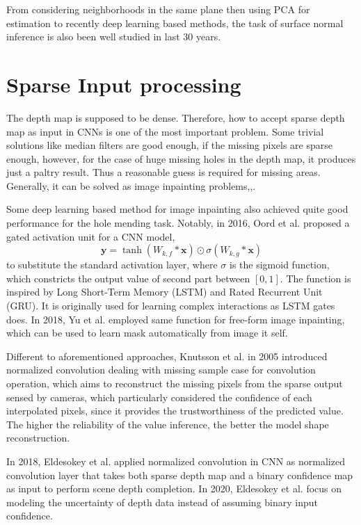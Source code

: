 From considering neighborhoods in the same plane then using PCA for estimation to recently deep learning based methods, the task of surface normal inference is also been well studied in last 30 years. 


\section{Sparse Input processing}

The depth map is supposed to be dense. Therefore, how to accept sparse depth map as input in CNNs is one of the most important problem. Some trivial solutions like median filters are good enough, if the missing pixels are sparse enough, however, for the case of huge missing holes in the depth map, it produces just a paltry result. Thus a reasonable guess is required for missing areas. Generally, it can be solved as image inpainting problems,\cite{inpainting1},\cite{inpainting2}. 

Some deep learning based method for image inpainting also achieved quite good performance for the hole mending task. 
Notably, in 2016, Oord et al. \cite{gated_activation} proposed a gated activation unit for a CNN model,
\[\textbf{y} = \tanh (W_{k,f} * \textbf{x}) \odot \sigma (W_{k,g} * \textbf{x})\]
to substitute the standard activation layer, where $ \sigma $ is the sigmoid function, which constricts the output value of second part between $ [0,1] $.  The function is inspired by Long Short-Term Memory (LSTM) \cite{lstm} and Rated Recurrent Unit (GRU).\cite{gru} It is originally used for learning complex interactions as LSTM gates does. In 2018, Yu et al. \cite{gconv} employed same function for free-form image inpainting, which can be used to learn mask automatically from image it self.

Different to aforementioned approaches, Knutsson et al. in 2005 introduced normalized convolution \cite{nconv} dealing with missing sample case for convolution operation, which aims to reconstruct the missing pixels from the sparse output sensed by cameras, which particularly considered the confidence of each interpolated pixels, since it provides the trustworthiness of the predicted value. The higher the reliability of the value inference, the better the model shape reconstruction.

In 2018, Eldesokey et al. \cite{ncnn} applied normalized convolution in CNN as normalized convolution layer that takes both sparse depth map and a binary confidence map as input to perform scene depth completion.
In 2020, Eldesokey et al. \cite{pncnn} focus on modeling the uncertainty of depth data instead of assuming binary input confidence.

